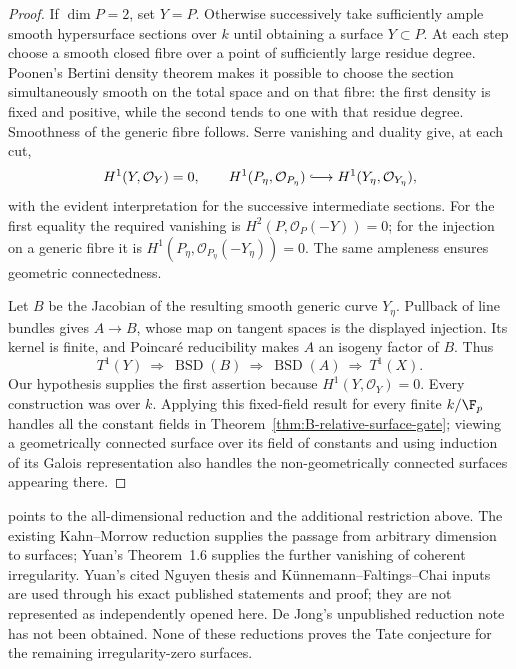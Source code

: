 \begin{proof}
If \(\dim P=2\), set \(Y=P\).  Otherwise successively take
sufficiently ample smooth hypersurface sections over \(k\) until
obtaining a surface \(Y\subset P\).  At each step choose a smooth
closed fibre over a point of sufficiently large residue degree.
Poonen's Bertini density theorem
\citep[Theorem~1.1, author-version p.~2]{DPoonen2004Bertini}
makes it possible to choose the
section simultaneously smooth on the total space and on that fibre:
the first density is fixed and positive, while the second tends to
one with that residue degree.  Smoothness of the generic fibre
follows.  Serre vanishing and duality give, at each cut,
\[
 H^1(Y,\mathcal O_Y)=0,
 \qquad
 H^1(P_\eta,\mathcal O_{P_\eta})
       \lhook\joinrel\longrightarrow H^1(Y_\eta,\mathcal O_{Y_\eta}),
\]
with the evident interpretation for the successive intermediate
sections.  For the first equality the required vanishing is
\(H^2(P,\mathcal O_P(-Y))=0\); for the injection on a generic
fibre it is \(H^1(P_\eta,\mathcal O_{P_\eta}(-Y_\eta))=0\).
The same ampleness ensures geometric connectedness.

Let \(B\) be the Jacobian of the resulting smooth generic curve
\(Y_\eta\).  Pullback of line bundles gives \(A\to B\), whose map
on tangent spaces is the displayed injection.  Its kernel is
finite, and Poincar\'e reducibility makes \(A\) an isogeny factor of
\(B\).  Thus
\[
 T^1(Y)\ \Longrightarrow\ \operatorname{BSD}(B)
       \ \Longrightarrow\ \operatorname{BSD}(A)
       \ \Longrightarrow\ T^1(X).
\]
Our hypothesis supplies the first assertion because
\(H^1(Y,\mathcal O_Y)=0\).  Every construction was over \(k\).
Applying this fixed-field result for every finite \(k/\F_p\)
handles all the constant fields in
Theorem~\ref{thm:B-relative-surface-gate}; viewing a geometrically
connected surface over its field of constants and using induction
of its Galois representation also handles the non-geometrically
connected surfaces appearing there.
\end{proof}

\begin{remark}
\label{rem:B-irregularity-zero-source-scope}
\citet[Remark~4.13, p.~56]{BErtlKellerQin2025} points to the
all-dimensional reduction and the additional restriction above.
The existing Kahn--Morrow reduction supplies the passage from
arbitrary dimension to surfaces; Yuan's Theorem~1.6 supplies the
further vanishing of coherent irregularity.  Yuan's cited
Nguyen thesis and K\"unnemann--Faltings--Chai inputs are used through
his exact published statements and proof; they are not represented
as independently opened here.  De Jong's unpublished reduction note
has not been obtained.  None of these reductions proves the Tate
conjecture for the remaining irregularity-zero surfaces.
\end{remark}
